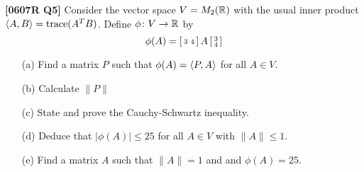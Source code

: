 \documentclass[a4paper]{article}
\begin{document}
\begin{problem}\textbf{[0607R Q5]}
 Consider the vector space $V=M_2({\mathbb{R}})$ with the usual inner product
 $\langle A,B\rangle=\operatorname{trace}(A^TB)$.  Define $\phi\colon V\to{\mathbb{R}}$ by
 \[ \phi(A)=\left[\begin{smallmatrix} 3& 4\end{smallmatrix}\right] A\left[\begin{smallmatrix} 3\\ 4\end{smallmatrix}\right] \]
 \begin{itemize}
  \item[(a)] Find a matrix $P$ such that $\phi(A)=\langle P,A\rangle$ for all
   $A\in V$.  
  \item[(b)] Calculate $\|P\|$ 
  \item[(c)] State and prove the Cauchy-Schwartz inequality. 
  \item[(d)] Deduce that $|\phi(A)|\leq 25$ for all $A\in V$
   with $\|A\|\leq 1$.  
  \item[(e)] Find a matrix $A$ such that $\|A\|=1$ and and
   $\phi(A)=25$. 
 \end{itemize}
\end{problem}
\end{document}
